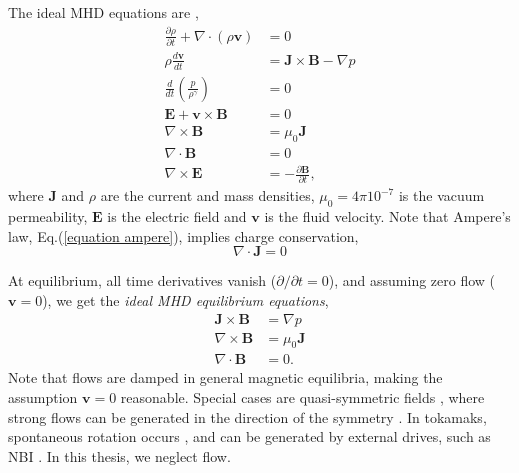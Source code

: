 \documentclass[my_thesis.tex]{subfiles}
\begin{document}
The ideal \ac{MHD} equations are \citep{Freidberg2014},
\begin{align}
	\frac{\partial \rho}{\partial t} + \nabla\cdot(\rho\mathbf{v}) &= 0 \label{mass equation}\\
	\rho\frac{d\mathbf{v}}{dt} &= \mathbf{J}\times\mathbf{B} - \nabla p \label{momentum equation}\\
	\frac{d}{dt}\left(\frac{p}{\rho^\gamma}\right) &= 0 \label{energy equation}\\
	\mathbf{E} + \mathbf{v}\times\mathbf{B} &= 0 \label{ideal Ohms law}\\
	\nabla\times\mathbf{B} &=\mu_0\mathbf{J} \label{equation ampere}\\
	\nabla\cdot\mathbf{B}&=0 \label{equation div B}\\
	\nabla\times\mathbf{E}&=-\frac{\partial \mathbf{B}}{\partial t}, \label{equation rot E}
\end{align}
where $\mathbf{J}$ and $\rho$ are the current and mass densities, $\mu_0=4\pi 10^{-7}$ is the vacuum permeability, $\mathbf{E}$ is the electric field and $\mathbf{v}$ is the fluid velocity. Note that Ampere's law, Eq.(\ref{equation ampere}), implies charge conservation,
\begin{equation}
	\nabla\cdot\mathbf{J} = 0\label{equation charge conservation}
\end{equation}

At equilibrium, all time derivatives vanish ($\partial/\partial t = 0$), and assuming zero flow ($\mathbf{v}=0$), we get the \emph{ideal MHD equilibrium equations},
\begin{align}
	\mathbf{J}\times\mathbf{B} &= \nabla p \label{equation perp force balance}\\
	\nabla\times\mathbf{B} &=\mu_0\mathbf{J}\\
	\nabla\cdot\mathbf{B}&=0.\label{equation div B ideal mhd}
\end{align}
Note that flows are damped in general magnetic equilibria, making the assumption $\mathbf{v}=0$ reasonable. Special cases are quasi-symmetric fields \citep{boozerTransportIsomorphicEquilibria1983,nuhrenbergQuasihelicallySymmetricToroidal1988,helanderTheoryPlasmaConfinement2014a,rodriguezNecessarySufficientConditions2020}, where strong flows can be generated in the direction of the symmetry \citep{spongGenerationDampingNeoclassical2005,helanderIntrinsicAmbipolarityRotation2008,simakovPlasmaRotationQuasisymmetric2011}. In tokamaks, spontaneous rotation occurs \citep{diamondPhysicsNondiffusiveTurbulent2009}, and can be generated by external drives, such as \ac{NBI} \citep{suckewerToroidalPlasmaRotation1979}. In this thesis, we neglect flow. 
\end{document}
